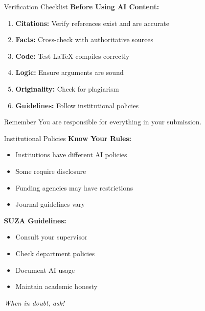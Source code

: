 \documentclass[aspectratio=169]{beamer}
\begin{document}
	\begin{frame}{Verification Checklist}
		\textbf{Before Using AI Content:}
		
		\begin{enumerate}
			\item \textbf{Citations:} Verify references exist and are accurate
			\item \textbf{Facts:} Cross-check with authoritative sources
			\item \textbf{Code:} Test LaTeX compiles correctly
			\item \textbf{Logic:} Ensure arguments are sound
			\item \textbf{Originality:} Check for plagiarism
			\item \textbf{Guidelines:} Follow institutional policies
		\end{enumerate}
		
		\vspace{0.5em}
		
		\begin{block}{Remember}
			You are responsible for everything in your submission.
		\end{block}
	\end{frame}
	
	\begin{frame}{Institutional Policies}
		\textbf{Know Your Rules:}
		\begin{itemize}
			\item Institutions have different AI policies
			\item Some require disclosure
			\item Funding agencies may have restrictions
			\item Journal guidelines vary
		\end{itemize}
		
		\vspace{0.5em}
		
		\textbf{SUZA Guidelines:}
		\begin{itemize}
			\item Consult your supervisor
			\item Check department policies
			\item Document AI usage
			\item Maintain academic honesty
		\end{itemize}
		
		\vspace{0.5em}
		
		\textit{When in doubt, ask!}
	\end{frame}
	
\end{document}
